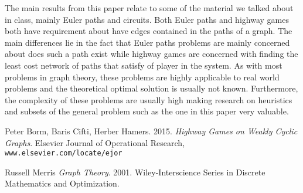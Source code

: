 \documentclass{article}
\begin{document}
The main results from this paper relate to some of the material we talked about in class, mainly Euler paths and circuits. Both Euler paths and highway games both have requirement about have edges contained in the paths of a graph. The main differences lie in the fact that Euler paths problems are mainly concerned about does such a path exist while highway games are concerned with finding the least cost network of paths that satisfy of player in the system. As with most problems in graph theory, these problems are highly applicable to real world problems and the theoretical optimal solution is usually not known. Furthermore, the complexity of these problems are usually high making research on heuristics and subsets of the general problem such as the one in this paper very valuable. 

 
\newpage
 
\onecolumn  
\begin{thebibliography}{9}

Peter Borm, Baris Cifti, Herber Hamers. 2015. 
\textit{Highway Games on Weakly Cyclic Graphs}. 
Elsevier Journal of Operational Research, \texttt{www.elsevier.com/locate/ejor}

Russell Merris
\textit{Graph Theory}. 2001.
Wiley-Interscience Series in Discrete Mathematics and Optimization. 
\end{thebibliography}
  
  
\end{document}
